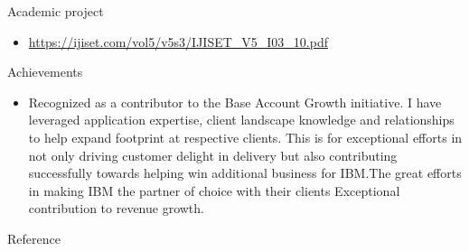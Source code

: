 \documentclass{resume} %
\begin{document}
\begin{workSection}{Academic project}
     \customItem[
        title=Internet of Things ( IoT ) Garbage Monitoring System,
        duration=Mar 2018,
        keyHighlight=Published in International Journal of Innovative Science, Engineering & Technology.
     ]
     \begin{itemize}
        \vspace{-0.5em}
        \itemsep -6pt {} 
        \item \url {https://ijiset.com/vol5/v5s3/IJISET_V5_I03_10.pdf}

     \end{itemize}

\end{workSection}

\begin{workSection}{Achievements}
     \experienceItem[
        company=Received the IBM Growth Award - 2023
    ]
     \begin{itemize}
        \vspace{-0.5em}
        \itemsep -6pt {} 
        \item Recognized as a contributor to the Base Account Growth initiative. I have leveraged application expertise, client landscape knowledge and relationships to help expand footprint at respective clients. This is for exceptional efforts in not only driving customer delight in delivery but also contributing successfully towards helping win additional business for IBM.The great efforts in making IBM the partner of choice with their clients Exceptional contribution to revenue growth.
     \end{itemize}

\end{workSection}

\begin{workSection}{Reference}
     \customItem[
        title=,
        keyHighlight=Available upon request,
        duration=
    ]
\end{workSection}
\end{document}
